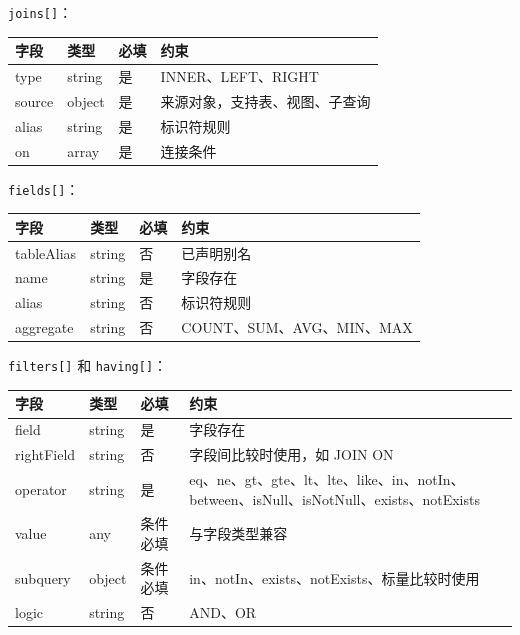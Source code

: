 \documentclass[
  a4paper,
  UTF8]{ctexart}
\begin{document}
\texttt{joins{[}{]}}：

\begin{longtable}[]{@{}llll@{}}
\toprule
字段 & 类型 & 必填 & 约束 \\
\midrule
\endhead
type & string & 是 & INNER、LEFT、RIGHT \\
source & object & 是 & 来源对象，支持表、视图、子查询 \\
alias & string & 是 & 标识符规则 \\
on & array & 是 & 连接条件 \\
\bottomrule
\end{longtable}

\texttt{fields{[}{]}}：

\begin{longtable}[]{@{}llll@{}}
\toprule
字段 & 类型 & 必填 & 约束 \\
\midrule
\endhead
tableAlias & string & 否 & 已声明别名 \\
name & string & 是 & 字段存在 \\
alias & string & 否 & 标识符规则 \\
aggregate & string & 否 & COUNT、SUM、AVG、MIN、MAX \\
\bottomrule
\end{longtable}

\texttt{filters{[}{]}} 和 \texttt{having{[}{]}}：

\begin{longtable}[]{@{}
  >{\raggedright\arraybackslash}p{}
  >{\raggedright\arraybackslash}p{}
  >{\raggedright\arraybackslash}p{}
  >{\raggedright\arraybackslash}p{}@{}}
\toprule
字段 & 类型 & 必填 & 约束 \\
\midrule
\endhead
field & string & 是 & 字段存在 \\
rightField & string & 否 & 字段间比较时使用，如 JOIN ON \\
operator & string & 是 &
eq、ne、gt、gte、lt、lte、like、in、notIn、between、isNull、isNotNull、exists、notExists \\
value & any & 条件必填 & 与字段类型兼容 \\
subquery & object & 条件必填 &
in、notIn、exists、notExists、标量比较时使用 \\
logic & string & 否 & AND、OR \\
\bottomrule
\end{longtable}
\end{document}
